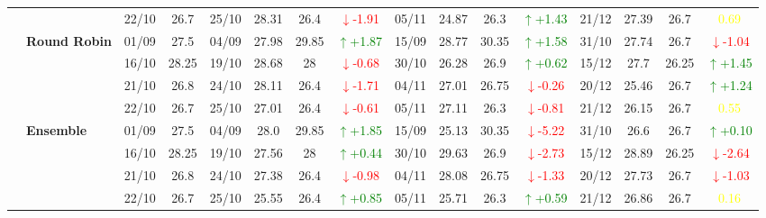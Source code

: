 \documentclass{ieeeaccess}
\begin{document}
{\begin{longtable}{llcc|cccc|cccc|cccc}
&
& 22/10 & 26.7 & 25/10 & 28.31 & 26.4 & \textcolor{red}{\(\downarrow\)-1.91} & 05/11 & 24.87 & 26.3 & \textcolor{green}{\(\uparrow\)+1.43} & 21/12 & 27.39 & 26.7 & \textcolor{yellow}{0.69} \\
\cmidrule(lr){2-16}


& \textbf{Round Robin}
& 01/09 & 27.5 & 04/09 & 27.98 & 29.85 & \textcolor{green}{\(\uparrow\)+1.87} & 15/09 & 28.77 & 30.35 & \textcolor{green}{\(\uparrow\)+1.58} & 31/10 & 27.74 & 26.7 & \textcolor{red}{\(\downarrow\)-1.04} \\

& 
& 16/10 & 28.25 & 19/10 & 28.68 & 28 & \textcolor{red}{\(\downarrow\)-0.68} & 30/10 & 26.28 & 26.9 & \textcolor{green}{\(\uparrow\)+0.62} & 15/12 & 27.7 & 26.25 & \textcolor{green}{\(\uparrow\)+1.45} \\

& 
& 21/10 & 26.8 & 24/10 & 28.11 & 26.4 & \textcolor{red}{\(\downarrow\)-1.71} & 04/11 & 27.01 & 26.75 & \textcolor{red}{\(\downarrow\)-0.26} & 20/12 & 25.46 & 26.7 & \textcolor{green}{\(\uparrow\)+1.24} \\

&
& 22/10 & 26.7 & 25/10 & 27.01 & 26.4 & \textcolor{red}{\(\downarrow\)-0.61} & 05/11 & 27.11 & 26.3 & \textcolor{red}{\(\downarrow\)-0.81} & 21/12 & 26.15 & 26.7 & \textcolor{yellow}{0.55} \\
\cmidrule(lr){2-16}


& \textbf{Ensemble}
& 01/09 & 27.5 & 04/09 & 28.0 & 29.85& \textcolor{green}{\(\uparrow\)+1.85} & 15/09 & 25.13 & 30.35 & \textcolor{red}{\(\downarrow\)-5.22} & 31/10 & 26.6 & 26.7 & \textcolor{green}{\(\uparrow\)+0.10} \\

& 
& 16/10 & 28.25 & 19/10 & 27.56 & 28 & \textcolor{green}{\(\uparrow\)+0.44} & 30/10 & 29.63 & 26.9 & \textcolor{red}{\(\downarrow\)-2.73} & 15/12 & 28.89 & 26.25 & \textcolor{red}{\(\downarrow\)-2.64} \\

& 
& 21/10 & 26.8 & 24/10 & 27.38 & 26.4 & \textcolor{red}{\(\downarrow\)-0.98} & 04/11 & 28.08 & 26.75 & \textcolor{red}{\(\downarrow\)-1.33} & 20/12 & 27.73 & 26.7 & \textcolor{red}{\(\downarrow\)-1.03} \\

&
& 22/10 & 26.7 & 25/10 & 25.55 & 26.4 & \textcolor{green}{\(\uparrow\)+0.85} & 05/11 & 25.71 & 26.3 & \textcolor{green}{\(\uparrow\)+0.59} & 21/12 & 26.86 & 26.7 & \textcolor{yellow}{0.16} \\
\midrule




\end{longtable}}
\end{document}
